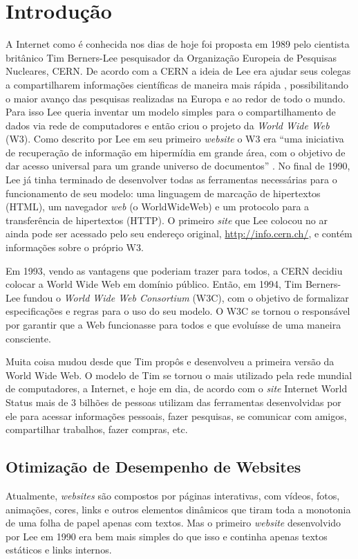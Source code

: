 %
%

\chapter{Introdução}\label{chap:introducao}

A Internet como é conhecida nos dias de hoje foi proposta em 1989 pelo cientista britânico Tim Berners-Lee pesquisador da Organização Europeia de Pesquisas Nucleares, CERN. De acordo com a CERN a ideia de Lee era ajudar seus colegas a compartilharem informações científicas de maneira mais rápida \cite{Cern}, possibilitando o maior avanço das pesquisas realizadas na Europa e ao redor de todo o mundo. Para isso Lee queria inventar um modelo simples para o compartilhamento de dados via rede de computadores e então criou o projeto da \textit{World Wide Web} (W3). Como descrito por Lee em seu primeiro \textit{website} o W3 era “uma iniciativa de recuperação de informação em hipermídia em grande área, com o objetivo de dar acesso universal para um grande universo de documentos” \cite{WorldWideWeb}. No final de 1990, Lee já tinha terminado de desenvolver todas as ferramentas necessárias para o funcionamento de seu modelo: uma linguagem de marcação de hipertextos (HTML), um navegador \textit{web} (o WorldWideWeb) e um protocolo para a transferência de hipertextos (HTTP). O primeiro \textit{site} que Lee colocou no ar ainda pode ser acessado pelo seu endereço original, \href{http://info.cern.ch/}{http://info.cern.ch/}, e contém informações sobre o próprio W3.

Em 1993, vendo as vantagens que poderiam trazer para todos, a CERN decidiu colocar a World Wide Web em domínio público. Então, em 1994, Tim Berners-Lee fundou o \textit{World Wide Web Consortium} (W3C), com o objetivo de formalizar especificações e regras para o uso do seu modelo. O W3C se tornou o responsável por garantir que a Web funcionasse para todos e que evoluísse de uma maneira consciente.

Muita coisa mudou desde que Tim propôs e desenvolveu a primeira versão da World Wide Web. O modelo de Tim se tornou o mais utilizado pela rede mundial de computadores, a Internet, e hoje em dia, de acordo com o \textit{site} Internet World Status mais de 3 bilhões de pessoas utilizam das ferramentas desenvolvidas por ele para acessar informações pessoais, fazer pesquisas, se comunicar com amigos, compartilhar trabalhos, fazer compras, etc.  \cite{InternetWorldStatus}


\section{Otimização de Desempenho de Websites}
Atualmente, \textit{websites} são compostos por páginas interativas, com vídeos, fotos, animações, cores, links e outros elementos dinâmicos que tiram toda a monotonia de uma folha de papel apenas com textos. Mas o primeiro \textit{website} desenvolvido por Lee em 1990 era bem mais simples do que isso e continha apenas textos estáticos e links internos.
 
